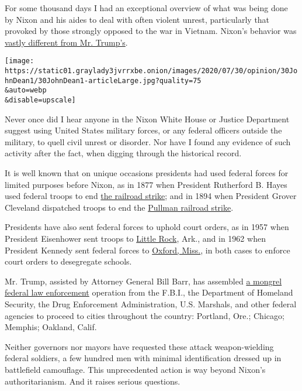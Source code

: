 For some thousand days I had an exceptional overview of what was being
done by Nixon and his aides to deal with often violent unrest,
particularly that provoked by those strongly opposed to the war in
Vietnam. Nixon's behavior was
\href{https://www.nytimes3xbfgragh.onion/2020/06/04/opinion/trump-nixon.html}{vastly
different from Mr. Trump's}.

\texttt{[image: https://static01.graylady3jvrrxbe.onion/images/2020/07/30/opinion/30JohnDean1/30JohnDean1-articleLarge.jpg?quality=75\\\&auto=webp\\\&disable=upscale]}

Never once did I hear anyone in the Nixon White House or Justice
Department suggest using United States military forces, or any federal
officers outside the military, to quell civil unrest or disorder. Nor
have I found any evidence of such activity after the fact, when digging
through the historical record.

It is well known that on unique occasions presidents had used federal
forces for limited purposes before Nixon, as in 1877 when President
Rutherford B. Hayes used federal troops to end
\href{http://ohiohistorycentral.org/w/Great_Railroad_Strike_of_1877}{the
railroad strike}; and in 1894 when President Grover Cleveland dispatched
troops to end the
\href{http://www.encyclopedia.chicagohistory.org/pages/1029.html}{Pullman
railroad strike}.

Presidents have also sent federal forces to uphold court orders, as in
1957 when President Eisenhower sent troops to
\href{http://crdl.usg.edu/export/html/dde/ddetimeline/crdl_dde_ddetimeline_130.html}{Little
Rock}, Ark., and in 1962 when President Kennedy sent federal forces to
\href{http://crdl.usg.edu/events/ole_miss_integration/?Welcome}{Oxford,
Miss.}, in both cases to enforce court orders to desegregate schools.

Mr. Trump, assisted by Attorney General Bill Barr, has assembled
\href{https://www.nytimes3xbfgragh.onion/2020/07/20/us/politics/trump-chicago-portland-federal-agents.html}{a
mongrel federal law enforcement} operation from the F.B.I., the
Department of Homeland Security, the Drug Enforcement Administration,
U.S. Marshals, and other federal agencies to proceed to cities
throughout the country: Portland, Ore.; Chicago; Memphis; Oakland,
Calif.

Neither governors nor mayors have requested these attack weapon-wielding
federal soldiers, a few hundred men with minimal identification dressed
up in battlefield camouflage. This unprecedented action is way beyond
Nixon's authoritarianism. And it raises serious questions.

